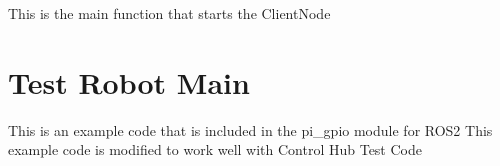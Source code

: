 \documentclass[letterpaper,10pt,english]{sphinxmanual}
\begin{document}
\begin{fulllineitems}
\label{\detokenize{index:Control_Hub.control_hub.control_hub.main}}
This is the main function that starts the ClientNode

\end{fulllineitems}



\chapter{Test Robot Main}
\label{\detokenize{index:module-Test_Robot.test_robot.test_robot.test_robot_server}}\label{\detokenize{index:test-robot-main}}
This is an example code that is included in the pi\_gpio module for ROS2
This example code is modified to work well with Control Hub Test Code
\end{document}
